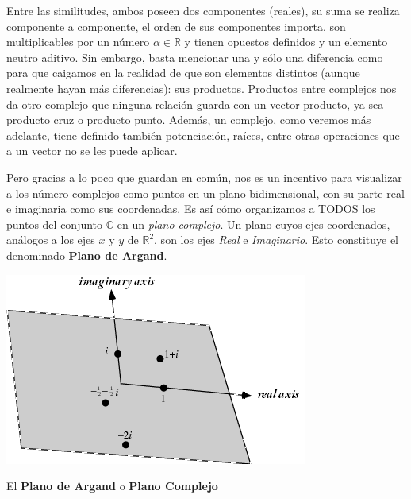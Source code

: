 \documentclass[12pt]{article}
\theoremstyle{definition}
\begin{document}
Entre las similitudes, ambos poseen dos componentes (reales), su suma se realiza componente a componente, el orden de sus componentes importa, son multiplicables por un n\'umero $\alpha \in \mathbb{R}$ y tienen opuestos definidos y un elemento neutro aditivo. Sin embargo, basta mencionar una y s\'olo una diferencia como para que caigamos en la realidad de que son elementos distintos (aunque realmente hayan m\'as diferencias): sus productos. Productos entre complejos nos da otro complejo que ninguna relaci\'on guarda con un vector producto, ya sea producto cruz o producto punto. Adem\'as, un complejo, como veremos m\'as adelante, tiene definido tambi\'en potenciaci\'on, ra\'ices, entre otras operaciones que a un vector no se les puede aplicar.

Pero gracias a lo poco que guardan en com\'un, nos es un incentivo para visualizar a los n\'umero complejos como puntos en un plano bidimensional, con su parte real e imaginaria como sus coordenadas. Es as\'i c\'omo organizamos a TODOS los puntos del conjunto $\mathbb{C}$ en un \textit{plano complejo}. Un plano cuyos ejes coordenados, an\'alogos a los ejes $x$ y $y$ de $\mathbb{R}^2$, son los ejes \textit{Real} e \textit{Imaginario}. Esto constituye el denominado \textbf{Plano de Argand}.

\begin{center}
	\includegraphics[scale=0.7]{Argand.png}
	\begin{center}
		El \textbf{Plano de Argand} o \textbf{Plano Complejo}
	\linebreak	
	\end{center}
\end{center}
\end{document}
